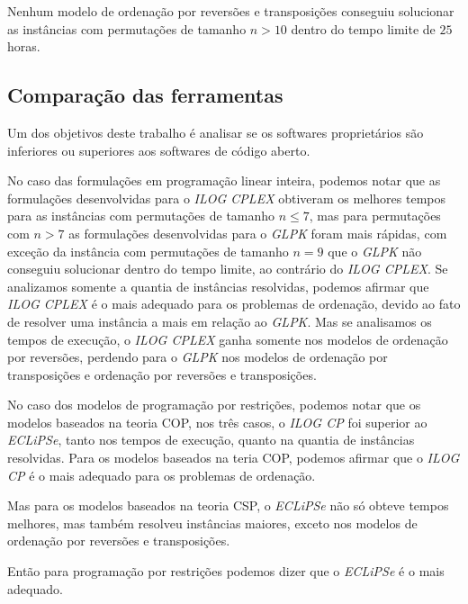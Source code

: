 Nenhum modelo de ordenação por reversões e transposições conseguiu
solucionar as instâncias com permutações de tamanho $n > 10$ dentro do
tempo limite de $25$ horas.



\subsection{Comparação das ferramentas}
\label{subsec:analise_ferramentas}
Um dos objetivos deste trabalho é analisar se os softwares
proprietários são inferiores ou superiores aos softwares de código
aberto.

No caso das formulações em programação linear inteira, podemos notar
que as formulações desenvolvidas para o \textit{ILOG CPLEX} obtiveram
os melhores tempos para as instâncias com permutações de tamanho
$n \le 7$, mas para permutações com $n > 7$ as formulações
desenvolvidas para o \textit{GLPK} foram mais rápidas, com exceção da
instância com permutações de tamanho $n = 9$ que o \textit{GLPK} não
conseguiu solucionar dentro do tempo limite, ao contrário
do \textit{ILOG CPLEX}. Se analizamos somente a quantia de instâncias
resolvidas, podemos afirmar que \textit{ILOG CPLEX} é o mais adequado
para os problemas de ordenação, devido ao fato de resolver uma
instância a mais em relação ao \textit{GLPK}. Mas se analisamos os
tempos de execução, o \textit{ILOG CPLEX} ganha somente nos modelos de
ordenação por reversões, perdendo para o \textit{GLPK} nos modelos de
ordenação por transposições e ordenação por reversões e transposições.

No caso dos modelos de programação por restrições, podemos notar que
os modelos baseados na teoria COP, nos três casos, o \textit{ILOG CP}
foi superior ao \textit{ECLiPSe}, tanto nos tempos de execução, quanto
na quantia de instâncias resolvidas. Para os modelos baseados na teria
COP, podemos afirmar que o \textit{ILOG CP} é o mais adequado para os
problemas de ordenação.

Mas para os modelos baseados na teoria CSP, o \textit{ECLiPSe} não só
obteve tempos melhores, mas também resolveu instâncias maiores, exceto
nos modelos de ordenação por reversões e transposições. 


Então para
programação por restrições podemos dizer que o \textit{ECLiPSe} é o
mais adequado.


